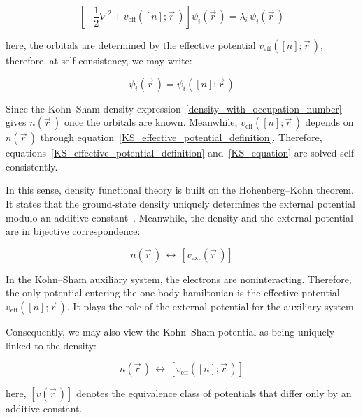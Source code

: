 \begin{equation}
    \left[-\frac{1}{2}\nabla^2+v_\mathrm{eff}([n];\vec{r}\,)\right]\psi_i(\vec{r}\,)
    = \lambda_i\,\psi_i(\vec{r}\,)
\label{KS_equation}
\end{equation}

here, the orbitals are determined by the effective potential $v_\mathrm{eff}([n];\vec{r}\,)$,
therefore, at self-consistency, we may write:

\begin{equation}
    \psi_i(\vec{r}\,)=\psi_i([n];\vec{r}\,)
\label{KS_orbitals_as_density_functionals}
\end{equation}

Since the Kohn--Sham density expression~\eqref{density_with_occupation_number} gives $n(\vec{r}\,)$ once the orbitals are known.
Meanwhile, $v_\mathrm{eff}([n];\vec{r}\,)$ depends on $n(\vec{r}\,)$ through equation~\eqref{KS_effective_potential_definition}.
Therefore, equations~\eqref{KS_effective_potential_definition} and~\eqref{KS_equation} are solved self-consistently.

In this sense, density functional theory is built on the Hohenberg--Kohn theorem.
It states that the ground-state density uniquely determines the external potential modulo an additive constant~\cite{hohenberg1964inhomogeneous,kohn1999nobel}.
Meanwhile, the density and the external potential are in bijective correspondence:

\begin{equation}
    n(\vec{r}\,)
    \,\longleftrightarrow\,
    \left[v_\mathrm{ext}(\vec{r}\,)\right]
\label{HK_density_potential_correspondence}
\end{equation}

In the Kohn--Sham auxiliary system, the electrons are noninteracting.
Therefore, the only potential entering the one-body hamiltonian is the effective potential $v_\mathrm{eff}([n];\vec{r}\,)$.
It plays the role of the external potential for the auxiliary system.

Consequently, we may also view the Kohn--Sham potential as being uniquely linked to the density:

\begin{equation}
    n(\vec{r}\,)
    \,\longleftrightarrow\,
    \left[v_\mathrm{eff}([n];\vec{r}\,)\right]
\label{KS_density_potential_correspondence}
\end{equation}

here, $\left[v(\vec{r}\,)\right]$ denotes the equivalence class of potentials that differ only by an additive constant.

